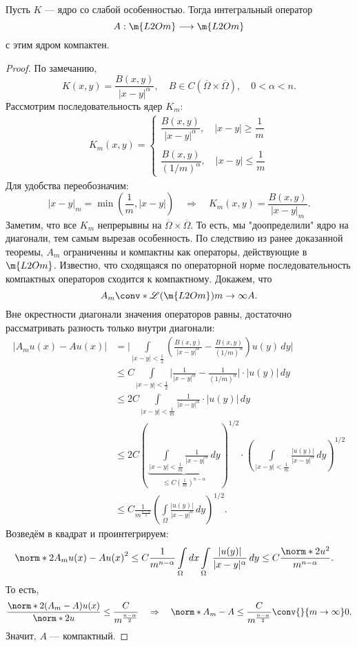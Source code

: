 \begin{theorem} Пусть $K$ --- ядро со слабой особенностью. Тогда интегральный оператор
$$ A : \m{L2Om} \longrightarrow \m{L2Om}$$
с этим ядром компактен.
\end{theorem}
\begin{proof} По замечанию,
$$ K(x,y) = \frac{B(x,y)} {|x-y|^\alpha}, \quad B \in C(\overline{\Omega} \times \overline{\Omega}), \quad 0 < \alpha < n.$$
Рассмотрим последовательность ядер $K_m$:
\begin{gather*}
K_m(x,y) =
	\begin{cases*}
		\dfrac {B(x,y)} {|x-y|^\alpha}, \quad |x-y| \geq \dfrac {1} {m} \\
		\\
		\dfrac {B(x,y)} {(1/m)^\alpha}, \quad |x-y| \leq \dfrac {1} {m}
	\end{cases*}
\end{gather*}
Для удобства переобозначим:
$$|x-y|_m = \min \left( \frac {1} {m} , |x-y| \right) \quad \Rightarrow \quad K_m(x,y) = \frac {B(x,y)} {|x-y|_m}.$$
Заметим, что все $K_m$ непрерывны на $\overline{\Omega} \times \overline{\Omega}$. То есть, мы "доопределили" ядро на диагонали, тем самым вырезав особенность. По следствию из ранее доказанной теоремы, $A_m$ ограниченны и компактны как операторы, действующие в $\m{L2Om}$. Известно, что сходящаяся по операторной норме последовательность компактных операторов сходится к компактному. Докажем, что
$$ A_m \conv*{\mathscr{L} (\m{L2Om})}{m\to \infty} A.$$
Вне окрестности диагонали значения операторов равны, достаточно рассматривать разность только внутри диагонали:
\begin{align*}
| A_m u(x) - Au(x)| &= \Bigg\rvert \int \limits_{|x-y| < \frac {1} {2}} \left( \frac {B(x,y)} {|x-y|^\alpha} - \frac {B(x,y)} {(1/m)^\alpha} \right) u(y) \, dy \Biggl\lvert \\
&\leq C \int \limits_{|x-y| < \frac {1} {2}} \Bigg\lvert \frac {1} {|x-y|^\alpha} - \frac {1} {(1/m)^\alpha} \Bigg\rvert \cdot |u(y)| \, dy \\
&\leq 2 C \int \limits_{|x-y| < \frac {1} {m}} \frac {1} {|x-y|^\alpha} \cdot |u(y)| \, dy \\
&\leq 2 C \left( \underbrace {\int \limits_{|x-y| < \frac {1} {m}} \frac {1} {|x-y|^\alpha} \, dy}_{\leq C \left( \frac {1} {m} \right)^{n-\alpha}} \right)^{1/2} \cdot \left( \int \limits_{|x-y| < \frac {1} {m}} \frac {|u(y)|} {|x-y|^\alpha} \, dy \right)^{1/2} \\
&\leq C \frac {1} {m^{\frac {n-\alpha} {2}}} \left( \int \limits_\Omega \frac {|u(y)|} {|x-y|^\alpha} \, dy \right)^{1/2}.
\end{align*}
Возведём в квадрат и проинтегрируем:
\begin{align*}
\norm*{2}{A_m u(x) - Au(x)}^2 &\leq C \frac {1} {m^{n-\alpha}} \int \limits_\Omega dx \int \limits_\Omega \frac {|u(y)|} {|x-y|^\alpha} \, dy \leq C \frac {\norm*{2}{u}^2} {m^{n-\alpha}}.
\end{align*}
То есть,
$$ \frac {\norm*{2} {(A_m - A)u(x)}} {\norm*{2}{u}} \leq \frac {C} {m^{\frac {n-\alpha} {2}}} \quad \Rightarrow \quad \norm*{}{A_m - A} \leq \frac {C} {m^{\frac{n-\alpha} {2}}} \conv{}{m \to \infty} 0.$$
Значит, $A$ --- компактный.


\end{proof}
